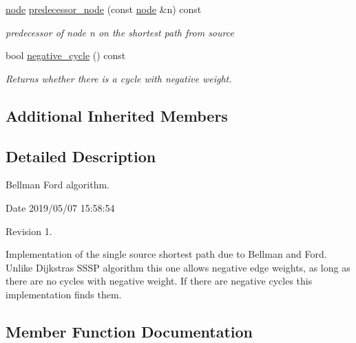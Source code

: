 \begin{DoxyCompactItemize}
\mbox{\hyperlink{classnode}{node}} \mbox{\hyperlink{classbellman__ford_a403e286ec8cbe3c30a7a729c5041155e}{predecessor\+\_\+node}} (const \mbox{\hyperlink{classnode}{node}} \&n) const
\begin{DoxyCompactList}\small\item\em predecessor of node {\itshape n} on the shortest path from source \end{DoxyCompactList}\item 
\mbox{\label{classbellman__ford_af9cd8be38bb1504089997581d9aa4f64}} 
bool \mbox{\hyperlink{classbellman__ford_af9cd8be38bb1504089997581d9aa4f64}{negative\+\_\+cycle}} () const
\begin{DoxyCompactList}\small\item\em Returns whether there is a cycle with negative weight. \end{DoxyCompactList}\end{DoxyCompactItemize}
\subsection*{Additional Inherited Members}


\subsection{Detailed Description}
Bellman Ford algorithm. 

\begin{DoxyParagraph}{Date}
2019/05/07 15\+:58\+:54 
\end{DoxyParagraph}
\begin{DoxyParagraph}{Revision}
1. 
\end{DoxyParagraph}


Implementation of the single source shortest path due to Bellman and Ford. Unlike Dijkstra\textquotesingle{}s S\+S\+SP algorithm this one allows negative edge weights, as long as there are no cycles with negative weight. If there are negative cycles this implementation finds them. 

\subsection{Member Function Documentation}
\mbox{\label{classbellman__ford_a9da2fb7d20ef1f726ee935474302d80b}} 
